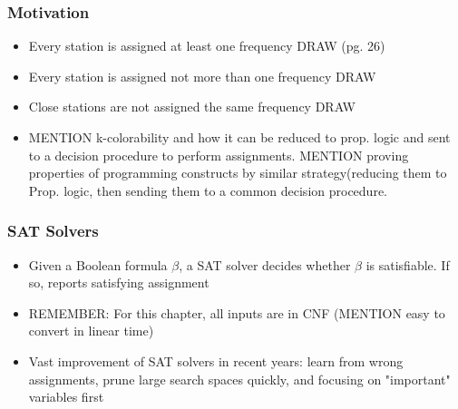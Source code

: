 \documentclass{beamer}
\begin{document}
\begin{frame}

 \frametitle{Motivation}
 
 \begin{itemize}
 
 \item Every station is assigned at least one frequency  DRAW (pg. 26)
 \item Every station is assigned not more than one frequency DRAW
 \item Close stations are not assigned the same frequency  DRAW
 \item  MENTION k-colorability and how it can be reduced to prop. logic and sent to a decision procedure to perform assignments.  MENTION  proving properties of programming constructs by similar strategy(reducing them to Prop. logic, then sending them to a common decision procedure.
 
 \end{itemize}
 
\end{frame}

\begin{frame}

 \frametitle{SAT Solvers}
 
 \begin{itemize}
 
 \item Given a Boolean formula \ensuremath{\beta}, a SAT solver decides whether \ensuremath{\beta} is satisfiable.  If so, reports satisfying assignment
 
 \item REMEMBER:  For this chapter, all inputs are in CNF  (MENTION easy to convert in linear time)
 \item Vast improvement of SAT solvers in recent years:  learn from wrong assignments, prune large search spaces quickly, and focusing on "important" variables first
 \end{itemize}
 
\end{frame}
\end{document}
